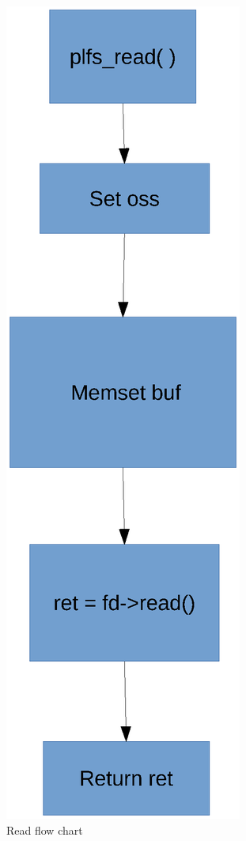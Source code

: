 \documentclass[conference]{IEEEtran}
\begin{document}
\begin{figure}
	\centerline{
		\includegraphics[scale=0.8]{read.eps}}
	\caption{Read flow chart}
\end{figure}
\end{document}

